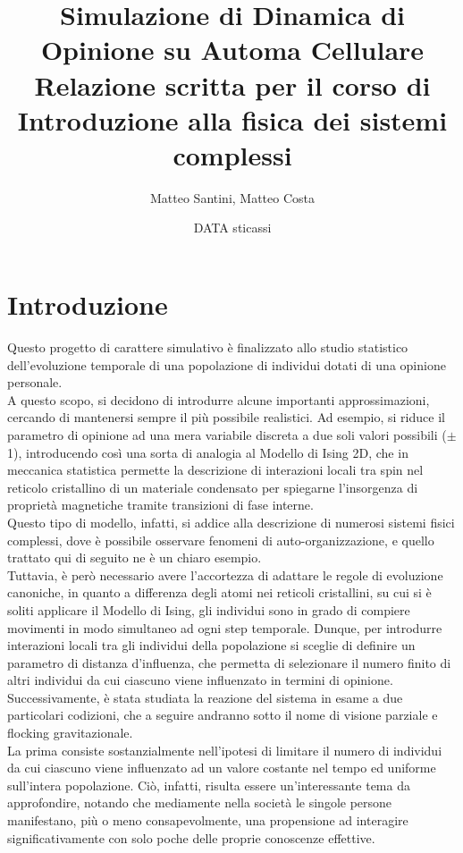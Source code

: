\documentclass{article}
\begin{document}
\title{\Huge Simulazione di Dinamica di Opinione su Automa Cellulare 
		\[\]\Large Relazione scritta per il corso di \quad \quad \quad \quad \quad \quad Introduzione alla fisica dei sistemi complessi \medskip
		}
\author{Matteo Santini, Matteo Costa}
\date{DATA sticassi}

\maketitle
\bigskip
\tableofcontents
\bigskip

\section{Introduzione}
\label{Sec:1}
Questo progetto di carattere simulativo è finalizzato allo studio statistico dell'evoluzione temporale di una popolazione di individui dotati di una opinione personale. 
\\ A questo scopo, si decidono di introdurre alcune importanti approssimazioni, cercando di mantenersi sempre il più possibile realistici. Ad esempio, si riduce il parametro di opinione ad una mera variabile discreta a due soli valori possibili ($\pm$1), introducendo così una sorta di analogia al Modello di Ising 2D, che in meccanica statistica permette la descrizione di interazioni locali tra spin nel reticolo cristallino di un materiale condensato per spiegarne l'insorgenza di proprietà magnetiche tramite transizioni di fase interne.
\\ Questo tipo di modello, infatti, si addice alla descrizione di numerosi sistemi fisici complessi, dove è possibile osservare fenomeni di auto-organizzazione, e quello trattato qui di seguito ne è un chiaro esempio. 
\\ Tuttavia, è però necessario avere l'accortezza di adattare le regole di evoluzione canoniche, in quanto a differenza degli atomi nei reticoli cristallini, su cui si è soliti applicare il Modello di Ising, gli individui sono in grado di compiere movimenti in modo simultaneo ad ogni step temporale. Dunque, per introdurre interazioni locali tra gli individui della popolazione si sceglie di definire un parametro di distanza d'influenza, che permetta di selezionare il numero finito di altri individui da cui ciascuno viene influenzato in termini di opinione.
\\ Successivamente, è stata studiata la reazione del sistema in esame a due particolari codizioni, che a seguire andranno sotto il nome di visione parziale e flocking gravitazionale.
\\ La prima consiste sostanzialmente nell'ipotesi di limitare il numero di individui da cui ciascuno viene influenzato ad un valore costante nel tempo ed uniforme sull'intera popolazione. Ciò, infatti, risulta essere un'interessante tema da approfondire, notando che mediamente nella società le singole persone manifestano, più o meno consapevolmente, una propensione ad interagire significativamente con solo poche delle proprie conoscenze effettive.
\end{document}
